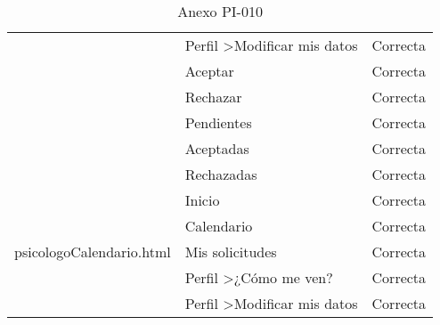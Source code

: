 \begin{table}[htpb]
\begin{tabularx}{\textwidth}{|l|l|X|}
                                          & Perfil \textgreater Modificar mis datos & Correcta            \\ \cline{2-3} 
                                          & Aceptar                                 & Correcta            \\ \cline{2-3} 
                                          & Rechazar                                & Correcta            \\ \cline{2-3} 
                                          & Pendientes                              & Correcta            \\ \cline{2-3} 
                                          & Aceptadas                               & Correcta            \\ \cline{2-3} 
                                          & Rechazadas                              & Correcta            \\ \hline
\multirow{5}{*}{psicologoCalendario.html} & Inicio                                  & Correcta            \\ \cline{2-3} 
                                          & Calendario                              & Correcta            \\ \cline{2-3} 
                                          & Mis solicitudes                         & Correcta            \\ \cline{2-3} 
                                          & Perfil \textgreater ¿Cómo me ven?       & Correcta            \\ \cline{2-3} 
                                          & Perfil \textgreater Modificar mis datos & Correcta            \\ \hline
\end{tabularx}
\caption{Anexo PI-010}
\end{table}


